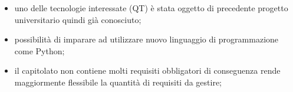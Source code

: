 \begin{itemize}
\item uno delle tecnologie interessate (QT) è stata oggetto di precedente progetto universitario quindi già conosciuto;
\item possibilità di imparare ad utilizzare nuovo linguaggio di programmazione come Python;
\item il capitolato non contiene molti requisiti obbligatori di conseguenza rende maggiormente flessibile la quantità di requisiti da gestire;
\end{itemize}
